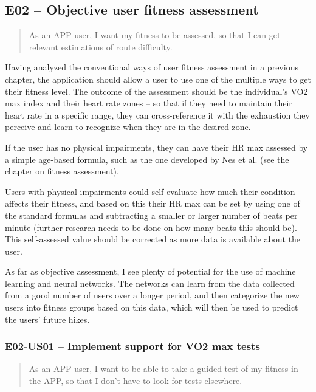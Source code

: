 
\subsection*{E02 -- Objective user fitness assessment}
\begin{quote}
As an APP user, I want my fitness to be assessed, so that I can get relevant estimations of route difficulty.
\end{quote}

Having analyzed the conventional ways of user fitness assessment in a previous chapter, the application should allow a user to use one of the multiple ways to get their fitness level.
The outcome of the assessment should be the individual's VO2 max index and their heart rate zones -- so that if they need to maintain their heart rate in a specific range, they can cross-reference it with the exhaustion they perceive and learn to recognize when they are in the desired zone.

If the user has no physical impairments, they can have their HR max assessed by a simple age-based formula, such as the one developed by Nes et al. (see the chapter on fitness assessment).

Users with physical impairments could self-evaluate how much their condition affects their fitness, and based on this their HR max can be set by using one of the standard formulas and subtracting a smaller or larger number of beats per minute (further research needs to be done on how many beats this should be).
This self-assessed value should be corrected as more data is available about the user.

As far as objective assessment, I see plenty of potential for the use of machine learning and neural networks.
The networks can learn from the data collected from a good number of users over a longer period, and then categorize the new users into fitness groups based on this data, which will then be used to predict the users' future hikes.

\subsubsection*{E02-US01 -- Implement support for VO2 max tests}
\begin{quote}
As an APP user, I want to be able to take a guided test of my fitness in the APP, so that I don't have to look for tests elsewhere.
\end{quote}

